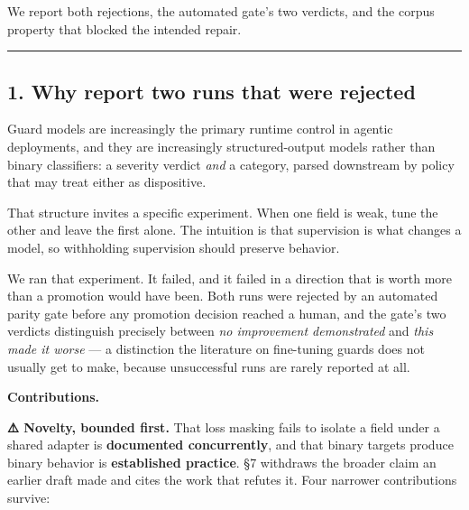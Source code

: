 We report both rejections, the automated gate's two verdicts, and the corpus property that blocked
the intended repair.

\begin{center}\rule{0.5\linewidth}{0.5pt}\end{center}

\subsection{1. Why report two runs that were rejected}\label{why-report-two-runs-that-were-rejected}

Guard models are increasingly the primary runtime control in agentic deployments, and they are
increasingly structured-output models rather than binary classifiers: a severity verdict \emph{and} a
category, parsed downstream by policy that may treat either as dispositive.

That structure invites a specific experiment. When one field is weak, tune the other and leave the
first alone. The intuition is that supervision is what changes a model, so withholding supervision
should preserve behavior.

We ran that experiment. It failed, and it failed in a direction that is worth more than a promotion
would have been. Both runs were rejected by an automated parity gate before any promotion decision
reached a human, and the gate's two verdicts distinguish precisely between \emph{no improvement
demonstrated} and \emph{this made it worse} --- a distinction the literature on fine-tuning guards does not
usually get to make, because unsuccessful runs are rarely reported at all.

\textbf{Contributions.}

\textbf{⚠️ Novelty, bounded first.} That loss masking fails to isolate a field under a shared adapter is
\textbf{documented concurrently}, and that binary targets produce binary behavior is \textbf{established
practice}. §7 withdraws the broader claim an earlier draft made and cites the work that refutes it.
Four narrower contributions survive:

